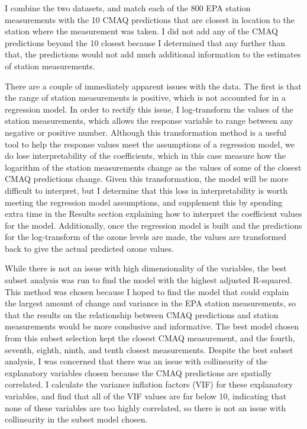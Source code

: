 \documentclass{svproc}
\begin{document}
I combine the two datasets, and match each of the 800 EPA station measurements with the 10 CMAQ predictions that are closest in location to the station where the measurement was taken. I did not add any of the CMAQ predictions beyond the 10 closest because I determined that any further than that, the predictions would not add much additional information to the estimates of station measurements. 

There are a couple of immediately apparent issues with the data. The first is that the range of station measurements is positive, which is not accounted for in a regression model. In order to rectify this issue, I log-transform the values of the station measurements, which allows the response variable to range between any negative or positive number. Although this transformation method is a useful tool to help the response values meet the assumptions of a regression model, we do lose interpretability of the coefficients, which in this case measure how the logarithm of the station measurements change as the values of some of the closest CMAQ predictions change. Given this transformation, the model will be more difficult to interpret, but I determine that this loss in interpretability is worth meeting the regression model assumptions, and supplement this by spending extra time in the Results section explaining how to interpret the coefficient values for the model. Additionally, once the regression model is built and the predictions for the log-transform of the ozone levels are made, the values are transformed back to give the actual predicted ozone values.

While there is not an issue with high dimensionality of the variables, the best subset analysis was run to find the model with the highest adjusted R-squared. This method was chosen because I hoped to find the model that could explain the largest amount of change and variance in the EPA station measurements, so that the results on the relationship between CMAQ predictions and station measurements would be more conslusive and informative. The best model chosen from this subset selection kept the closest CMAQ measurement, and the fourth, seventh, eighth, ninth, and tenth closest measurements. Despite the best subset analysis, I was concerned that there was an issue with collinearity of the explanatory variables chosen because the CMAQ predictions are spatially correlated. I calculate the variance inflation factors (VIF) for these explanatory variables, and find that all of the VIF values are far below 10, indicating that none of these variables are too highly correlated, so there is not an issue with collinearity in the subset model chosen. 
\end{document}

